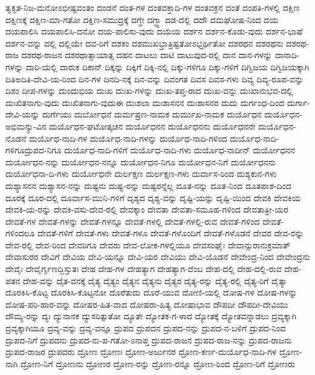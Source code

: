 {ತ್ವಕೃತ-ನಿಜ-ಮನೋಽಭೀಷ್ಟವಂತಂ
ದಂಡನೆ
ದಂತ-ಗಳ
ದಂತವಕ್ತಾದಿ-ಗಳ
ದಂತವಕ್ರನ
ದಂತೆ
ದಂಪತಿ-ಗಳಲ್ಲಿ
ದಕ್ಷಿಣ
ದಕ್ಷಿಣಕ್ಕೆ
ದಕ್ಷಿಣ-ಮಾ-ಗತೋ
ದಕ್ಷಿಣ-ಸಮುದ್ರಕ್ಕೆ
ದಗ್ಧೇ
ದಗ್ಧ್ವಾ
ದಡ-ದಲ್ಲಿ
ದದೌ
ದಮಘೋಷ-ನಿಂದ
ದಯ
ದಯಪಾಲಿಸಿ
ದಯಪಾಲಿಸಿ-ದನೋ
ದಯ-ಪಾಲಿಸು-ವುದು
ದಯೆಯ
ದರ್ಶನ
ದರ್ಶನ-ಕೊಡು-ವುದು
ದರ್ಶನ-ಭಾಷೆ
ದರ್ಶನ-ವನ್ನು
ದಲ್ಲಿ
ದಲ್ಲಿಯೇ
ದವ-ರಿಗೆ
ದಶಕಂ
ದಶಮುಖಭ್ರಾತ್ರಿಷ್ಟತೋಽಭ್ತರ್ಥಿತೋ
ದಶರಥನ
ದಶರಥನು
ದಶರಥ-ರಾಜ
ದಶರಥ-ರಾಜನ
ದಶರಥಾತ್ಸಾಯಾತ್ಸ
ದಹನ
ದಾಟಲು
ದಾಟಿ
ದಾಟುವುದ-ರಲ್ಲಿ
ದಾನ
ದಾನ-ಗಳನ್ನು
ದಾನಾದಿ-ಗಳನ್ನು
ದಾರಿ-ಯಲ್ಲಿ
ದಾರುಕ
ದಿಕಾನ್
ದಿಕ್ಕನ್ನು
ದಿಕ್ಕಿಗೆ
ದಿಕ್ಕಿ-ನಲ್ಲಿ
ದಿಕ್ಕು-ಗಳಿಗೂ
ದಿಕ್ಕು-ಗಳಿಗೆ
ದಿಗ್ವಿಜಯ
ದಿಗ್ವಿಜಯಕ್ಕಾಗಿ
ದಿತಿಅದಿತಿ-ದೇವಿ-ಯ-ರಿಂದ
ದಿನ-ಗಳ
ದಿನದಿ-ನಕ್ಕೆ
ದಿನ-ವನ್ನು
ದಿವಂಗತ
ದಿವಸ
ದಿವಸ-ಗಳು
ದಿವ್ಯ
ದಿವ್ಯ-ರೂಪ-ವನ್ನು
ದಿಶಂ
ದೀಪ-ಗಳನ್ನು
ದುಂದುಭಿಯ
ದುಃಖ
ದುಃಖ-ಗಳನ್ನು
ದುಃಖ-ತಪ್ತ-ರಾದ
ದುಃಖ-ವನ್ನು
ದುಃಖಾನುಭವ-ದಲ್ಲಿ
ದುಃಖಿತನಾಗು-ವುದು
ದುಃಖಿತನಾಗು-ವುದುಈ
ದುಃಶಲಾ
ದುಃಶಾಸನನ
ದುಃಶಾಸನರ
ದುದು
ದುರ್ಗಂಧ-ದಿಂದ
ದುರ್ಗಾ-ದೇವಿ-ಯನ್ನು
ದುರ್ಗೆಯು
ದುರ್ಬೋಧನೆ
ದುರ್ಮಷ್ರಣ-ನಾಮಕ
ದುರ್ಮುಖ-ನಾಮಕ
ದುರ್ಯೊಧನ
ದುರ್ಯೊಧನ-ಅಭಿಮನ್ಯು-ವಿನ
ದುರ್ಯೊಧನ-ಘಟೋತ್ಕಚನ
ದುರ್ಯೊಧನನ
ದುರ್ಯೊಧನನು
ದುರ್ಯೊಧನನೇ
ದುರ್ಯೊಧನ-ನೊಡನೆ
ದುರ್ಯೊಧ-ನಾದಿ-ಗಳ
ದುರ್ಯೊಧ-ನಾದಿ-ಗಳನ್ನು
ದುರ್ಯೊಧ-ನಾದಿ-ಗಳಿಂದ
ದುರ್ಯೊಧ-ನಾದಿ-ಗಳಿಗೂದ್ರುಪದ-ನಿಗೂ
ದುರ್ಯೊಧ-ನಾದಿ-ಗಳಿಗೆ
ದುರ್ಯೊಧ-ನಾದಿ-ಗಳು
ದುರ್ಯೊಧ-ನಾದೀನ್
ದುರ್ಯೋಧನನ
ದುರ್ಯೋಧನ-ನನ್ನು
ದುರ್ಯೋಧನ-ನನ್ನೂ
ದುರ್ಯೋಧನ-ನಿಗೂ
ದುರ್ಯೋಧನ-ನಿಗೆ
ದುರ್ಯೋಧನನು
ದುರ್ಯೋಧನಾ-ದಿ-ಗಳು
ದುರ್ಯೋಧನೇ
ದುರ್ಲಕ್ಷಣ
ದುರ್ಲಕ್ಷಣ-ಗಳು
ದುರ್ವಾಸ-ರಿಂದ
ದುಶ್ಯಕುನ-ಗಳು
ದುಶ್ಯಾಸನನ
ದುಶ್ಯಾಸನ-ನನ್ನು
ದುಷ್ಟನು
ದುಷ್ಟ-ರನ್ನು
ದುಷ್ಟರನ್ನೆಲ್ಲ
ದೂತ-ನನ್ನು
ದೂತ-ನಿಂದ
ದೂತಪಾಶ-ದಿಂದ
ದೂರಕ್ಕೆ
ದೂರ-ದಲ್ಲಿ
ದೂರ್ವಾಸ-ಮುನಿ-ಗಳಿಗೆ
ದೃಶ್ಯದ
ದೃಶ್ಯ-ವನ್ನು
ದೃಷ್ಟಿ-ಯನ್ನು
ದೃಷ್ಟಿ-ಯಿಂದ
ದೇವಕಿ
ದೇವಕಿಯ
ದೇವಕಿ-ಯ-ರನ್ನು
ದೇವಕಿ-ವಸು-ದೇವ-ರಲ್ಲಿ
ದೇವಕ್ಕಾಂ
ದೇವತಾ
ದೇವತಾ-ಸಮೂಹ-ಗಳಿಂದ
ದೇವತಾತ್ರೀ-ಯರ
ದೇವತೆ-ಗಳ
ದೇವತೆ-ಗಳನ್ನು
ದೇವತೆ-ಗಳನ್ನೂ
ದೇವತೆ-ಗಳಲ್ಲಿ
ದೇವತೆ-ಗಳಲ್ಲಿ-ರುವ
ದೇವತೆ-ಗಳಿಂದ
ದೇವತೆ-ಗಳಿಂದಲೂ
ದೇವತೆ-ಗಳಿಗೆ
ದೇವತೆ-ಗಳು
ದೇವತೆ-ಗಳೂ
ದೇವತೆ-ಗಳೊಂದಿಗೆ
ದೇವತೆ-ಗಳೊಡನೆ
ದೇವರ
ದೇವ-ರನ್ನು
ದೇವ-ರಲ್ಲಿ
ದೇವ-ರಿಂದ
ದೇವರಿಗೂ
ದೇವರು
ದೇವ-ಲೋಕ-ಗಳಲ್ಲಿಯೂ
ದೇವಸಂಘೈಃ
ದೇವಾನ್ಸುರಾನುಕ್ರಮಾತ್
ದೇವಾಸುರರ
ದೇವಿಗೆ
ದೇವಿಯ
ದೇವಿ-ಯನ್ನೂ
ದೇವಿ-ಯರ
ದೇವಿಯು
ದೇವಿ-ಯೊಡನೆ
ದೇವೇಂದ್ರ-ನಿಂದ
ದೇವೇಂದ್ರನು
ದೇವೈಃ
ದೇವೈರ್ಗೃಣದ್ಭಿಸ್ತುತಃ
ದೇಹ
ದೇಹ-ಗಳ
ದೇಹತ್ಯಾಗ
ದೇಹತ್ಯಾಗ-ವೆಂಬ
ದೇಹ-ದಲ್ಲಿ
ದೇಹ-ದಲ್ಲಿ-ರುವ
ದೇಹ-ಪತನ
ದೇಹ-ವನ್ನು
ದೈತ-ವನಕ್ಕೆ
ದೈತ್ಯ
ದೈತ್ಯಂ
ದೈತ್ಯನ
ದೈತ್ಯನು
ದೈತ್ಯರ
ದೈತ್ಯ-ರನ್ನು
ದೈತ್ಯ-ರಲ್ಲಿ
ದೈತ್ಯ-ರಿಗೆ
ದೈತ್ಯಾ
ದೊರಕಿಸಿ-ಕೊಟ್ಟ
ದೊರಕಿಸಿ-ಕೊಟ್ಟನೋ
ದೊರೆತುದು
ದೊರೆ-ಯುವ
ದೋಣಿ-ಯಲ್ಲಿ
ದೋಷ-ಗಳ
ದೋಷ-ಗಳನ್ನು
ದೋಷ-ಪರಿ-ಹಾರ-ವನ್ನು
ದೋಷರ-ಹಿತ-ವಾದ
ದೋಷರಾ-ಹಿತ್ಯ
ದೋಷಾಭಾವ
ದೌಪದೀ
ದೌಪದೀ-ದೇವಿಯು
ದೌಮ್ಯ-ರನ್ನು
ದ್ಯಃ
ದ್ಯುನಾನಕ
ದ್ಯುಸರಿತ್ಸುತೋ
ದ್ಯೂತೇ
ದ್ಯೋತಕ-ಗ-ಳಾದ
ದ್ಯೋತಕ್ಕೆ
ದ್ಯೋತವನ್ನಾಡಲು
ದ್ರವ್ಯಕ್ಕಾಗಿ
ದ್ರವ್ಯಕ್ಕಾಗಿಯೂ
ದ್ರವ್ಯ-ವನ್ನು
ದ್ರವ್ಯ-ವನ್ನೂ
ದ್ರುಪದ
ದ್ರುಪದನ
ದ್ರುಪದ-ನನ್ನು
ದ್ರುಪದ-ನ-ಬಳಿಗೆ
ದ್ರುಪದ-ನಿಂದ
ದ್ರುಪದ-ನಿಗೆ
ದ್ರುಪದನು
ದ್ರುಪದ-ನು-ಪ-ಗತೋ-ಽನಾಪ್ತ
ದ್ರುಪದ-ರಾಜನ
ದ್ರುಪದ-ರಾಜ-ನನ್ನು
ದ್ರುಪದ-ರಾಜನು
ದ್ರುಪದ-ರಾಜರ
ದ್ರುಪದರು
ದ್ರೋಣ
ದ್ರೋಣಃ
ದ್ರೋಣ-ಅರ್ಜುನರ
ದ್ರೋಣ-ಕರ್ಣ-ದುರ್ಯೊಧ-ನಾದಿ-ಗಳ
ದ್ರೋಣ-ನಾಗಿ
ದ್ರೋಣ-ನಿಗೆ
ದ್ರೋಣನು
ದ್ರೋಣರ
ದ್ರೋಣ-ರನ್ನು
ದ್ರೋಣ-ರನ್ನೂ
ದ್ರೋಣ-ರಿಂದ
ದ್ರೋಣ-ರಿಗೆ
ದ್ರೋಣರು
}
